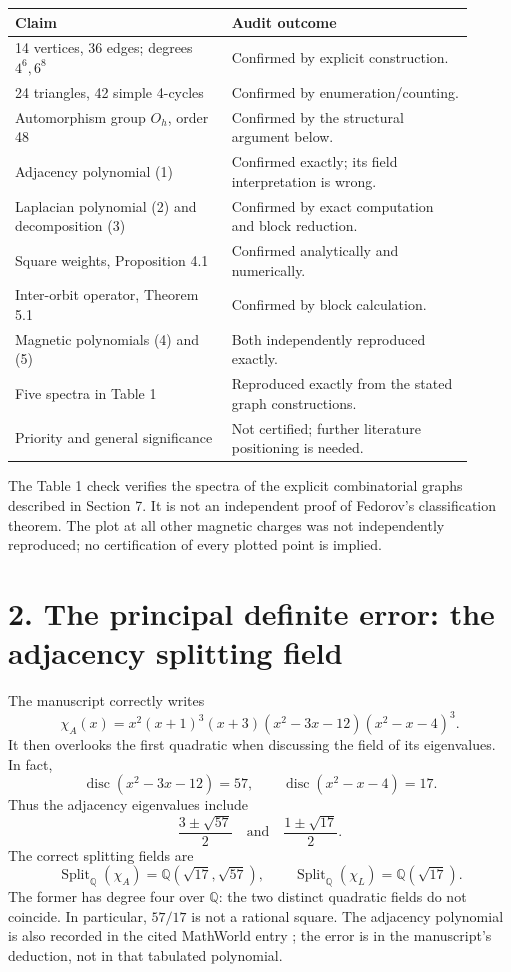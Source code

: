 \documentclass[11pt,a4paper]{article}
\newcommand{\Q}{\mathbb Q}
\begin{document}
\begin{center}\small
\begin{tabular}{p{0.43\linewidth}p{0.48\linewidth}}
\toprule
Claim & Audit outcome\\\midrule
14 vertices, 36 edges; degrees $4^6,6^8$ & Confirmed by explicit construction.\\
24 triangles, 42 simple 4-cycles & Confirmed by enumeration/counting.\\
Automorphism group $O_h$, order 48 & Confirmed by the structural argument below.\\
Adjacency polynomial (1) & Confirmed exactly; its field interpretation is wrong.\\
Laplacian polynomial (2) and decomposition (3) & Confirmed by exact computation and block reduction.\\
Square weights, Proposition 4.1 & Confirmed analytically and numerically.\\
Inter-orbit operator, Theorem 5.1 & Confirmed by block calculation.\\
Magnetic polynomials (4) and (5) & Both independently reproduced exactly.\\
Five spectra in Table 1 & Reproduced exactly from the stated graph constructions.\\
Priority and general significance & Not certified; further literature positioning is needed.\\\bottomrule
\end{tabular}
\end{center}
The Table 1 check verifies the spectra of the explicit combinatorial graphs described in Section 7. It is not an independent proof of Fedorov's classification theorem. The plot at all other magnetic charges was not independently reproduced; no certification of every plotted point is implied.

\section*{2. The principal definite error: the adjacency splitting field}
The manuscript correctly writes
\begin{equation}
\chi_A(x)=x^2(x+1)^3(x+3)(x^2-3x-12)(x^2-x-4)^3.
\end{equation}
It then overlooks the first quadratic when discussing the field of its eigenvalues. In fact,
\[
\operatorname{disc}(x^2-3x-12)=57,\qquad
\operatorname{disc}(x^2-x-4)=17.
\]
Thus the adjacency eigenvalues include
\[
\frac{3\pm\sqrt{57}}2 \quad\text{and}\quad
\frac{1\pm\sqrt{17}}2.
\]
The correct splitting fields are
\begin{equation}\boxed{
\operatorname{Split}_{\Q}(\chi_A)=\Q(\sqrt{17},\sqrt{57}),\qquad
\operatorname{Split}_{\Q}(\chi_L)=\Q(\sqrt{17}).}
\end{equation}
The former has degree four over $\Q$: the two distinct quadratic fields do not coincide. In particular, $57/17$ is not a rational square. The adjacency polynomial is also recorded in the cited MathWorld entry \cite{mw}; the error is in the manuscript's deduction, not in that tabulated polynomial.
\end{document}
